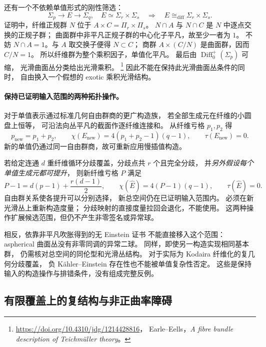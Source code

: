 \documentclass[UTF8,fontset=fandol,zihao=-4,oneside,openany]{ctexbook}
\theoremstyle{cjkplain}
\numberwithin{equation}{chapter}
\begin{document}
还有一个不依赖单值形式的刚性筛选：
\begin{equation}
 \Sigma_p\longrightarrow E\longrightarrow\Sigma_q,\quad
 E\simeq\Sigma_r\times\Sigma_s
 \quad\Longrightarrow\quad
 E\cong_{\mathrm{diff}}\Sigma_r\times\Sigma_s .
 \label{BUNTOP:product-rigidity}
\end{equation}
证明中，纤维正规群 \(N\) 位于 \(A\times C=\Pi_r\times\Pi_s\)。
\(N\cap A\) 与 \(N\cap C\) 是 \(N\) 中逐点交换的正规子群；
曲面群中非平凡正规子群的中心化子平凡，故至少一者为 \(1\)。
不妨 \(N\cap A=1\)。与 \(A\) 取交换子便得 \(N\subset C\)；
商群 \(A\times(C/N)\) 是曲面群，因而 \(C/N=1\)。
所以纤维群为整个乘积因子，单值化平凡。
最后由 \(\operatorname{Diff}_0^+(\Sigma_p)\) 可缩，
光滑曲面丛分类给出光滑乘积。%
\footnote{\url{https://doi.org/10.4310/jdg/1214428816}，
Earle--Eells，\emph{A fibre bundle description of Teichm\"uller theory}。}
因此不能在保持此光滑曲面丛条件的同时，
自由换入一个假想的 exotic 乘积光滑结构。

\paragraph{保持已证明输入范围的两种拓扑操作。}
对于单值表示通过标准几何自由群商的更广构造族，
若全部生成元在纤维的小圆盘上恒等，
可沿法向丛平凡的截面作逐纤维连接和。
从纤维亏格 \(p_1,p_2\) 得
\[
 p_{\mathrm{new}}=p_1+p_2,\qquad
 \chi(E_{\mathrm{new}})=4(p_1+p_2-1)(q-1),\qquad
 \tau(E_{\mathrm{new}})=0 .
\]
新的单值仍通过同一自由群商，故可重新应用慢插值构造。

若给定连通 \(d\) 重纤维循环分歧覆盖，分歧点共 \(r\) 个且完全分歧，
并\emph{另外假设每个单值生成元都可提升}，
则新纤维亏格 \(P\) 满足
\[
 P-1=d(p-1)+\frac{r(d-1)}2,\qquad
 \chi(\widehat E)=4(P-1)(q-1),\qquad \tau(\widehat E)=0.
\]
自由群关系使各提升可以分别选择，
新总空间仍在已证明输入范围内。
必须在新光滑丛上重新构造度量；
分歧映射的直接度量拉回会退化，不能使用。
这两种操作扩展候选范围，但仍不产生非零签名或异常球。

相反，依靠非平凡吹胀得到的无 Einstein 证书
不能直接移入这个范围：
aspherical 曲面丛没有非零同调的异常二球。
同样，即使另一构造实现相同基本群，
仍需核对总空间的同伦型和光滑丛结构。
对于实际为 Kodaira 纤维化的复几何分歧覆盖，
负 K\"ahler--Einstein 存在性也不能被单值复杂性否定。
这些是保持输入的构造操作与排错条件，没有组成完整反例。

\subsection{有限覆盖上的复结构与非正曲率障碍}
\label{BUNTOP:covers}
\end{document}

